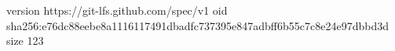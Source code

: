 version https://git-lfs.github.com/spec/v1
oid sha256:e76dc88eebe8a1116117491dbadfc737395e847adbff6b55c7c8e24e97dbbd3d
size 123
